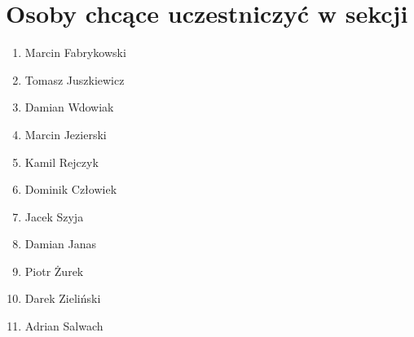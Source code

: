 \documentclass[a4paper,12pt]{article}
\begin{document}
\section{Osoby chcące uczestniczyć w sekcji}
\begin{enumerate}
\item Marcin Fabrykowski
\item Tomasz Juszkiewicz
\item Damian Wdowiak
\item Marcin Jezierski
\item Kamil Rejczyk
\item Dominik Człowiek
\item Jacek Szyja
\item Damian Janas
\item Piotr Żurek
\item Darek Zieliński
\item Adrian Salwach
\end{enumerate}
\end{document}

